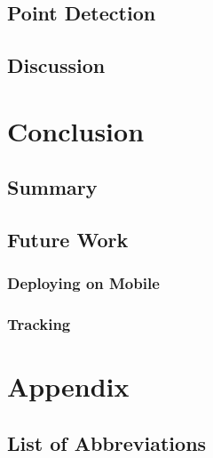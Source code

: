 \documentclass[10pt]{book}
\begin{document}
\section{Point Detection}

\section{Discussion}


\chapter{Conclusion}
\label{chap:conclusion}

\section{Summary}

\section{Future Work}

\subsection{Deploying on Mobile}

\subsection{Tracking}

\chapter{Appendix}

\section{List of Abbreviations}
\end{document}
